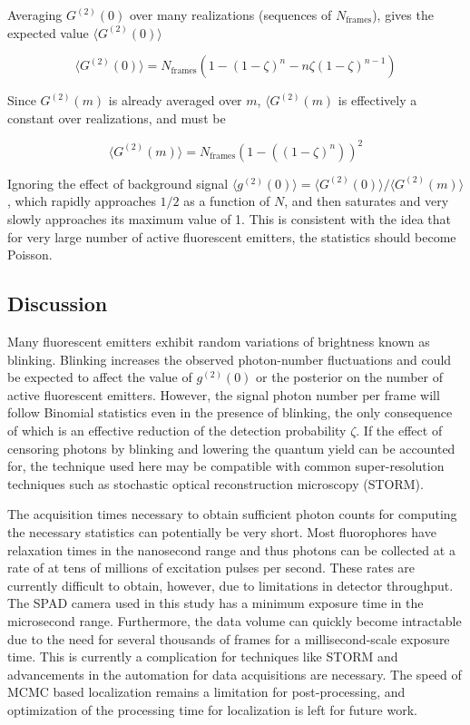 Averaging $G^{(2)}(0)$ over many realizations (sequences of $N_{\mathrm{frames}}$), gives the expected value $\langle G^{(2)}(0)\rangle $

\begin{equation}
\langle G^{(2)}(0)\rangle = N_{\mathrm{frames}}(1 - (1-\zeta)^n - n\zeta (1-\zeta)^{n-1})
\end{equation}

Since $G^{(2)}(m)$ is already averaged over $m$, $\langle G^{(2)}(m) $ is effectively a constant over realizations, and must be

\begin{equation}
\langle G^{(2)}(m)\rangle =  N_{\mathrm{frames}} \left(1 - \left((1-\zeta)^n\right)\right)^2
\end{equation}

Ignoring the effect of background signal $\langle g^{(2)}(0)\rangle =\langle G^{(2)}(0)\rangle/\langle G^{(2)}(m)\rangle$, which rapidly approaches $1/2$ as a function of $N$, and then saturates and very slowly approaches its maximum value of 1. This is consistent with the idea that for very large number of active fluorescent emitters, the statistics should become Poisson.



\subsection{Discussion}

Many fluorescent emitters exhibit random variations of brightness known as blinking. Blinking increases the observed photon-number fluctuations and could be expected to affect the value of $g^{(2)}(0)$ or the posterior on the number of active fluorescent emitters. However, the signal photon number per frame will follow Binomial statistics even in the presence of blinking, the only consequence of which is an effective reduction of the detection probability $\zeta$. If the effect of censoring photons by blinking and lowering the quantum yield can be accounted for, the technique used here may be compatible with common super-resolution techniques such as stochastic optical reconstruction microscopy (STORM). 

The acquisition times necessary to obtain sufficient photon counts for computing the necessary statistics can potentially be very short. Most fluorophores have relaxation times in the nanosecond range and thus photons can be collected at a rate of at tens of millions of excitation pulses per second. These rates are currently difficult to obtain, however, due to limitations in detector throughput. The SPAD camera used in this study has a minimum exposure time in the microsecond range. Furthermore, the data volume can quickly become intractable due to the need for several thousands of frames for a millisecond-scale exposure time. This is currently a complication for techniques like STORM and advancements in the automation for data acquisitions are necessary. The speed of MCMC based localization remains a limitation for post-processing, and optimization of the processing time for localization is left for future work. 

